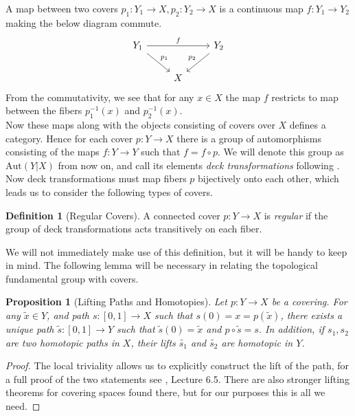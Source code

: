 \documentclass{article}
\theoremstyle{definition}
\newtheorem{definition}[theorem]{Definition}
\theoremstyle{remark}
\theoremstyle{plain}
\newtheorem{proposition}[theorem]{Proposition}
\begin{document}
\indent A map between two covers $p_1: Y_1 \to X, p_2: Y_2 \to X$ is a continuous map $f: Y_1 \to Y_2$ making the below diagram commute.
\[\begin{tikzcd}
	{Y_1} && {Y_2} \\
	& X
	\arrow["f", from=1-1, to=1-3]
	\arrow["{p_1}", from=1-1, to=2-2]
	\arrow["{p_2}"', from=1-3, to=2-2]
\end{tikzcd}\]
From the commutativity, we see that for any $x \in X$ the map $f$ restricts to map between the fibers $p_1^{-1}(x)$ and $p_2^{-1}(x)$.\\
\indent Now these maps along with the objects consisting of covers over $X$ defines a category.
Hence for each cover $p:Y \to X$ there is a group of automorphisms consisting of the maps $f: Y \to Y$ such that $f = f \circ p$.
We will denote this group as $\text{Aut}(Y|X)$ from now on, and call its elements \textit{deck transformations} following \cite{FomenkoFuchs}.
Now deck transformations must map fibers $p$ bijectively onto each other, which leads us to consider the following types of covers.

\begin{definition}[Regular Covers]
	A connected cover $p: Y \to X$ is \textit{regular} if the group of deck transformations acts transitively on each fiber.
\end{definition}

We will not immediately make use of this definition, but it will be handy to keep in mind.
The following lemma will be necessary in relating the topological fundamental group with covers.

\begin{proposition}[Lifting Paths and Homotopies]	
	Let $p: Y \to X$ be a covering. 
	For any $\widetilde{x} \in Y$, and path $s: [0,1] \to X$ such that $s(0) = x = p(\widetilde{x})$, there exists a unique path $\widetilde{s}:[0,1] \to Y$ such that $\widetilde{s}(0) = \widetilde{x}$ and $p \circ \widetilde{s} = s$.
	In addition, if $s_1, s_2$ are two homotopic paths in $X$, their lifts $\widetilde{s_1}$ and $\widetilde{s_2}$ are homotopic in $Y$.
\end{proposition}

\begin{proof}
	The local triviality allows us to explicitly construct the lift of the path, for a full proof of the two statements see \cite{FomenkoFuchs}, Lecture 6.5.
	There are also stronger lifting theorems for covering spaces found there, but for our purposes this is all we need.
\end{proof}
		
\end{document}
